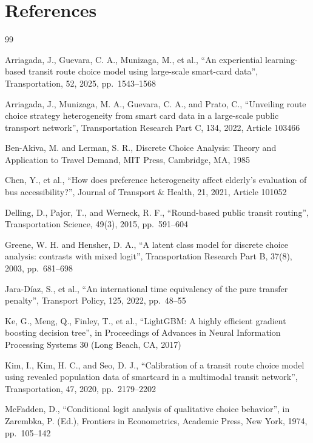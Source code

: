 \documentclass[12pt,a4paper]{article}
\begin{document}
\section{References}
\renewcommand{\refname}{}
\vspace{-24pt}
\begin{thebibliography}{99}\bibspacing

Arriagada, J., Guevara, C. A., Munizaga, M., et al., ``An experiential
learning-based transit route choice model using large-scale smart-card data'',
Transportation, 52, 2025, pp.\ 1543--1568

Arriagada, J., Munizaga, M. A., Guevara, C. A., and Prato, C., ``Unveiling route
choice strategy heterogeneity from smart card data in a large-scale public
transport network'', Transportation Research Part C, 134, 2022, Article 103466

Ben-Akiva, M. and Lerman, S. R., Discrete Choice Analysis: Theory and
Application to Travel Demand, MIT Press, Cambridge, MA, 1985

Chen, Y., et al., ``How does preference heterogeneity affect elderly's
evaluation of bus accessibility?'', Journal of Transport \& Health, 21, 2021,
Article 101052

Delling, D., Pajor, T., and Werneck, R. F., ``Round-based public transit
routing'', Transportation Science, 49(3), 2015, pp.\ 591--604

Greene, W. H. and Hensher, D. A., ``A latent class model for discrete choice
analysis: contrasts with mixed logit'', Transportation Research Part B, 37(8),
2003, pp.\ 681--698

Jara-D\'iaz, S., et al., ``An international time equivalency of the pure
transfer penalty'', Transport Policy, 125, 2022, pp.\ 48--55

Ke, G., Meng, Q., Finley, T., et al., ``LightGBM: A highly efficient gradient
boosting decision tree'', in Proceedings of Advances in Neural Information
Processing Systems 30 (Long Beach, CA, 2017)

Kim, I., Kim, H. C., and Seo, D. J., ``Calibration of a transit route choice
model using revealed population data of smartcard in a multimodal transit
network'', Transportation, 47, 2020, pp.\ 2179--2202

McFadden, D., ``Conditional logit analysis of qualitative choice behavior'', in
Zarembka, P. (Ed.), Frontiers in Econometrics, Academic Press, New York, 1974,
pp.\ 105--142


\end{thebibliography}
\end{document}
